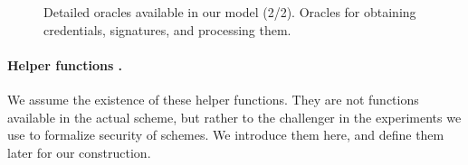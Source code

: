{\begin{figure*}[htp!]
{\begin{minipage}[t]{.55\textwidth}
        
      \end{minipage}
      
    }

    \caption{Detailed oracles available in our model (2/2). Oracles for
      obtaining credentials, signatures, and processing them.
    }
    \label{fig:oracles2}
  \end{figure*}
}

\paragraph{Helper functions %
  .}
We assume the existence of these helper functions. They are not functions
available in the actual scheme, but rather to the challenger in the experiments
we use to formalize security of \UAS schemes. We introduce them here, and define
them later for our construction.

